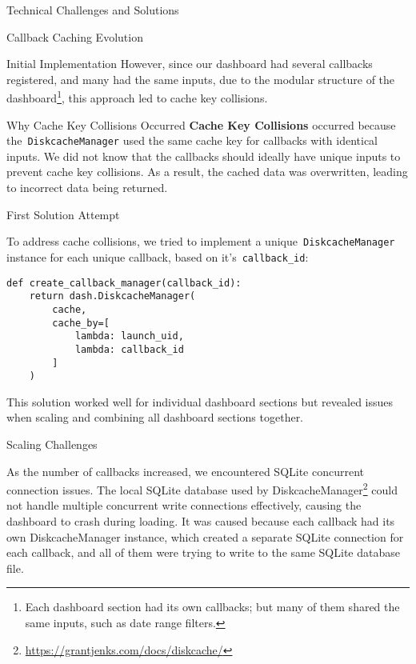 \begin{section}{Technical Challenges and Solutions}
\begin{subsection}{Callback Caching Evolution}
\begin{subsubsection}{Initial Implementation}
			However, since our dashboard had several callbacks registered, and many had the same inputs,
			due to the modular structure of the dashboard\footnote{Each dashboard section had its own callbacks; but many of them shared the same inputs, such as date range filters.}, this approach led to cache key collisions.

			\begin{infobox}{Why Cache Key Collisions Occurred}
				\textbf{Cache Key Collisions} occurred because the~\texttt{DiskcacheManager} used the same cache key for callbacks with identical inputs.
				We did not know that the callbacks should ideally have unique inputs to prevent cache key collisions.
				As a result, the cached data was overwritten, leading to incorrect data being returned.
			\end{infobox}
		\end{subsubsection}

		\begin{subsubsection}{First Solution Attempt}
			\label{subsubsec:implementation-technical-challenges-caching-first}

			To address cache collisions, we tried to implement a unique~\texttt{DiskcacheManager} instance for each unique callback, based on it's~\texttt{callback\_id}:

			\begin{listing}[H]
				\caption{Unique Cache Managers Per Callback}
				\begin{verbatim}
def create_callback_manager(callback_id):
    return dash.DiskcacheManager(
        cache,
        cache_by=[
            lambda: launch_uid,
            lambda: callback_id
        ]
    )
				\end{verbatim}
				\label{lst:dashboard-implementation-cache-unique}
			\end{listing}

			This solution worked well for individual dashboard sections but revealed issues when scaling and combining all dashboard sections together.
		\end{subsubsection}

		\begin{subsubsection}{Scaling Challenges}
			\label{subsubsec:implementation-technical-challenges-caching-scaling}

			As the number of callbacks increased, we encountered SQLite concurrent connection issues.
			The local SQLite database used by DiskcacheManager\footnote{\url{https://grantjenks.com/docs/diskcache/}} could not handle multiple concurrent write connections effectively, causing the dashboard to crash during loading.
			It was caused because each callback had its own DiskcacheManager instance, which created a separate SQLite connection for each callback, and all of them were trying to write to the same SQLite database file.


\end{subsubsection}
\end{subsection}
\end{section}
